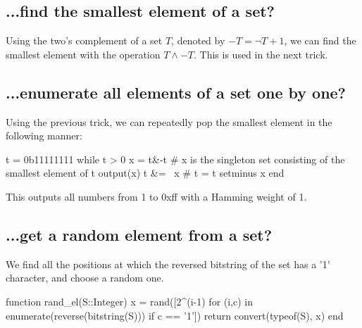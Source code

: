 \subsection*{...find the smallest element of a set?}
Using the two's complement of a set $T$, denoted by $-T = \lnot T+1$, we can find the smallest element with the operation $T\land -T$. This is used in the next trick.

\subsection*{...enumerate all elements of a set one by one?}
Using the previous trick, we can repeatedly pop the smallest element in the following manner:
\begin{jllisting}
  t = 0b11111111
  while t > 0
    x = t&-t  # x is the singleton set consisting of the smallest element of t
    output(x)
    t &= ~x   # t = t setminus x
  end
\end{jllisting}
This outputs all numbers from 1 to 0xff with a Hamming weight of 1.

\subsection*{...get a random element from a set?}
We find all the positions at which the reversed bitstring of the set has a '1' character, and choose a random one.

\begin{jllisting}
function rand_el(S::Integer)
  x = rand([2^(i-1) for (i,c) in enumerate(reverse(bitstring(S))) if c == '1'])
  return convert(typeof(S), x)
end
\end{jllisting}